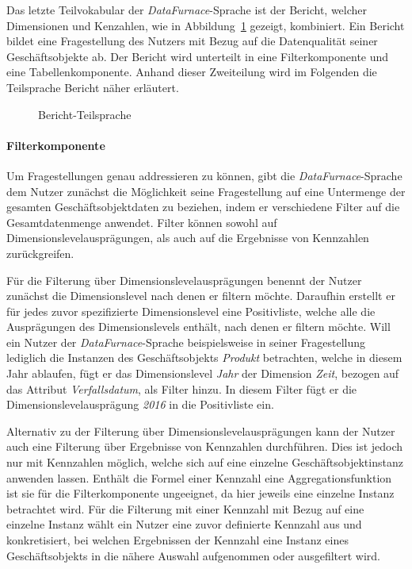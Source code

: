 \documentclass[
  language=german, %
  type=bachelor,%
  ngerman
]{isthesis}
\begin{document}
\begin{content}
  Das letzte Teilvokabular der \textit{DataFurnace}-Sprache ist der Bericht,
  welcher Dimensionen und Kenzahlen, wie in
  Abbildung~\ref{language_spec-erm-bericht} gezeigt, kombiniert. Ein Bericht
  bildet eine Fragestellung des Nutzers mit Bezug auf die Datenqualität seiner
  Geschäftsobjekte ab. Der Bericht wird unterteilt in eine Filterkomponente und
  eine Tabellenkomponente. Anhand dieser Zweiteilung wird im Folgenden die
  Teilsprache Bericht näher erläutert.

  \begin{figure}
    \resizebox{120px}{!}{}
    \caption{Bericht-Teilsprache}\label{language_spec-erm-bericht}
  \end{figure}
  
  \paragraph{Filterkomponente}\label{paragraph:filternde-komponente} Um
  Fragestellungen genau addressieren zu können, gibt die
  \textit{DataFurnace}-Sprache dem Nutzer zunächst die Möglichkeit seine
  Fragestellung auf eine Untermenge der gesamten Geschäftsobjektdaten zu
  beziehen, indem er verschiedene Filter auf die Gesamtdatenmenge anwendet.
  Filter können sowohl auf Dimensionslevelausprägungen, als auch auf die
  Ergebnisse von Kennzahlen zurückgreifen. 
  
  Für die Filterung über Dimensionslevelausprägungen benennt der Nutzer
  zunächst die Dimensionslevel nach denen er filtern möchte. Daraufhin erstellt
  er für jedes zuvor spezifizierte Dimensionslevel eine Positivliste, welche
  alle die Ausprägungen des Dimensionslevels enthält, nach denen er filtern
  möchte. Will ein Nutzer der \textit{DataFurnace}-Sprache beispielsweise in
  seiner Fragestellung lediglich die Instanzen des Geschäftsobjekts
  \textit{Produkt} betrachten, welche in diesem Jahr ablaufen, fügt er das
  Dimensionslevel \textit{Jahr} der Dimension \textit{Zeit}, bezogen auf das
  Attribut \textit{Verfallsdatum}, als Filter hinzu. In diesem Filter fügt er
  die Dimensionslevelausprägung \textit{2016} in die Positivliste ein.

	Alternativ zu der Filterung über Dimensionslevelausprägungen kann der Nutzer
	auch eine Filterung über Ergebnisse von Kennzahlen durchführen. Dies ist
	jedoch nur mit Kennzahlen möglich, welche sich auf eine einzelne
	Geschäftsobjektinstanz anwenden lassen. Enthält die Formel einer Kennzahl
	eine Aggregationsfunktion ist sie für die Filterkomponente ungeeignet, da
	hier jeweils eine einzelne Instanz betrachtet wird. Für die Filterung mit
	einer Kennzahl mit Bezug auf eine einzelne Instanz wählt ein Nutzer eine
	zuvor definierte Kennzahl aus und konkretisiert, bei welchen Ergebnissen der
	Kennzahl eine Instanz eines Geschäftsobjekts in die nähere Auswahl
	aufgenommen oder ausgefiltert wird.


\end{content}
\end{document}
